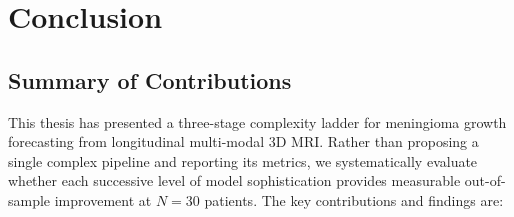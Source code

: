 \section{Conclusion}
\label{sec:conclusion}

\subsection{Summary of Contributions}
\label{sec:conc:summary}

This thesis has presented a three-stage complexity ladder for meningioma
growth forecasting from longitudinal multi-modal 3D MRI. Rather than
proposing a single complex pipeline and reporting its metrics, we
systematically evaluate whether each successive level of model
sophistication provides measurable out-of-sample improvement at $N = 30$
patients. The key contributions and findings are:

